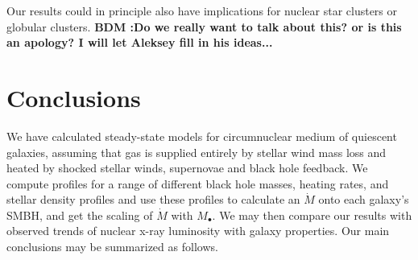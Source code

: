 \documentclass[usenatbib,fleqn]{mn2e}
\newcommand{\Mdot}{\dot{M}}
\newcommand{\Mbh}[1][]{M_{\bullet#1}}
\begin{document}
Our results could in principle also have implications for nuclear star clusters or globular clusters.  {\bf BDM :Do we really want to talk about this?  or is this an apology? I will let Aleksey fill in his ideas...}


\section{Conclusions}
\label{sec:conclusions}


We have calculated steady-state models for circumnuclear medium of
quiescent galaxies, assuming that gas is supplied entirely by stellar
wind mass loss and heated by shocked stellar winds, supernovae and
black hole feedback. We compute profiles for a range of different
black hole masses, heating rates, and stellar density profiles and use
these profiles to calculate an $\Mdot$ onto each galaxy's SMBH, and
get the scaling of $\Mdot$ with $\Mbh$. We may then compare our
results with observed trends of nuclear x-ray luminosity with galaxy
properties. Our main conclusions may be summarized as follows.
\end{document}
